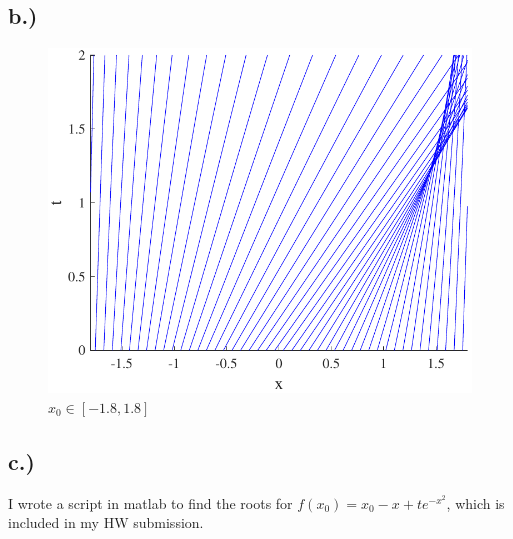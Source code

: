\documentclass{article}
\begin{document}
\subsection*{b.)}
\begin{figure}[H]
  \centering
    \includegraphics[width=\textwidth]{hw_13_plot1.pdf}
    \caption{$x_0 \in [-1.8, 1.8]$}
\end{figure}
\subsection*{c.)}
I wrote a script in matlab to find the roots for $f(x_0) = x_0 - x + te^{-x^2}$, which is included in my HW submission.
\end{document}
